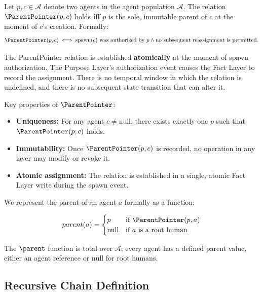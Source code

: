 \begin{definition}[ParentPointer]
Let $p, c \in \mathcal{A}$ denote two agents in the agent population $\mathcal{A}$. The relation $\ParentPointer(p, c)$ holds \textbf{iff} $p$ is the sole, immutable parent of $c$ at the moment of $c$'s creation. Formally:
\begin{equation}
\ParentPointer(p, c) \iff \text{spawn}(c) \text{ was authorized by } p \land \text{no subsequent reassignment is permitted.}
\end{equation}
\end{definition}

The ParentPointer relation is established \textbf{atomically} at the moment of spawn authorization. The Purpose Layer's authorization event causes the Fact Layer to record the assignment. There is no temporal window in which the relation is undefined, and there is no subsequent state transition that can alter it.

Key properties of $\ParentPointer$:

\begin{itemize}
    \item \textbf{Uniqueness:} For any agent $c \neq \text{null}$, there exists exactly one $p$ such that $\ParentPointer(p, c)$ holds.
    \item \textbf{Immutability:} Once $\ParentPointer(p, c)$ is recorded, no operation in any layer may modify or revoke it.
    \item \textbf{Atomic assignment:} The relation is established in a single, atomic Fact Layer write during the spawn event.
\end{itemize}

We represent the parent of an agent $a$ formally as a function:

\begin{equation}
parent(a) = \begin{cases}
p & \text{if } \ParentPointer(p, a) \\
\text{null} & \text{if } a \text{ is a root human}
\end{cases}
\end{equation}

The $\parent$ function is total over $\mathcal{A}$; every agent has a defined parent value, either an agent reference or $\text{null}$ for root humans.

\subsection{Recursive Chain Definition}

